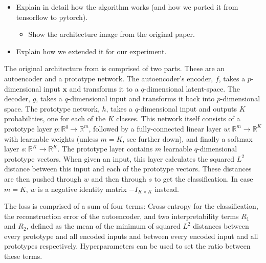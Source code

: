 \begin{itemize}
    \item Explain in detail how the algorithm works (and how we ported it from tensorflow to pytorch).
    \begin{itemize}
        \item Show the architecture image from the original paper.
    \end{itemize}
    \item Explain how we extended it for our experiment.
\end{itemize}

The original architecture from \citep{li2018deep} is comprised of two parts. These are an autoencoder and a prototype network. The autoencoder's encoder, $f$, takes a $p$-dimensional input $\textbf{x}$ and transforms it to a $q$-dimensional latent-space. The decoder, $g$, takes a $q$-dimensional input and transforms it back into $p$-dimensional space. The prototype network, $h$, takes a $q$-dimensional input and outputs $K$ probabilities, one for each of the $K$ classes. This network itself consists of a prototype layer $p : \mathbb{R}^q\rightarrow\mathbb{R}^m$, followed by a fully-connected linear layer $w : \mathbb{R}^m\rightarrow\mathbb{R}^K$ with learnable weights (unless $m = K$, see further down), and finally a softmax layer $s : \mathbb{R}^K\rightarrow\mathbb{R}^K$. The prototype layer contains $m$ learnable $q$-dimensional prototype vectors. When given an input, this layer calculates the squared $L^2$ distance between this input and each of the prototype vectors. These distances are then pushed through $w$ and then through $s$ to get the classification. In case $m = K$, $w$ is a negative identity matrix $-I_{K \times K}$ instead.

The loss is comprised of a sum of four terms: Cross-entropy for the classification, the reconstruction error of the autoencoder, and two interpretability terms $R_1$ and $R_2$, defined as the mean of the minimum of squared $L^2$ distances between every prototype and all encoded inputs and between every encoded input and all prototypes respectively. Hyperparameters can be used to set the ratio between these terms.